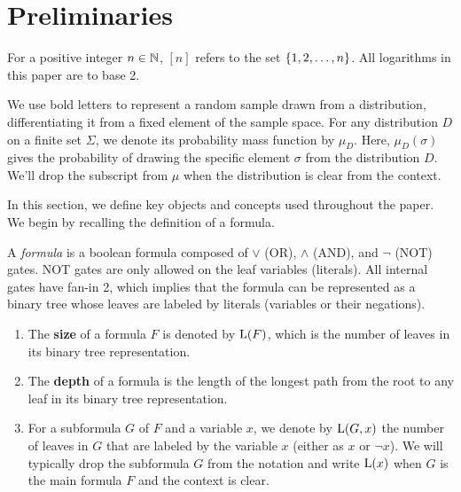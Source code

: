 \section{Preliminaries}
\label{sec:preliminaries}

For a positive integer $n \in \mathbb{N}$, $[n]$ refers to the set $\left\{ 1, 2, \dots, n \right\}$. All logarithms in this paper are to
base 2.

We use bold letters to represent a random sample drawn from a distribution, differentiating it from a fixed element of the sample space. For any distribution $D$ on a finite set $\Sigma$, we denote its probability mass function by $\mu_D$. Here, $\mu_D(\sigma)$ gives the probability of drawing the specific element $\sigma$ from the distribution $D$. We'll drop the subscript from $\mu$ when the distribution is clear from the context. 

In this section, we define key objects and concepts used throughout the paper. We begin by recalling the definition of a \demorgan formula.

\begin{definition}  %
\label{def:demorgan_fomula}
A \emph{\demorgan formula} is a boolean formula composed of $\lor$ (OR), $\land$ (AND), and $\neg$ (NOT) gates. NOT gates are only allowed on the leaf variables (literals). All internal gates have fan-in 2, which implies that the formula can be represented as a binary tree whose leaves are labeled by literals (variables or their negations).
\begin{enumerate}
    \item The \textbf{size} of a \demorgan formula $F$ is denoted by $\mathrm{L}(F)$, which is the number of leaves in its binary tree representation. 
    \item The \textbf{depth} of a \demorgan formula is the length of the longest path from the root to any leaf in its binary tree representation.
    \item For a subformula $G$ of $F$ and a variable $x$, we denote by $\mathrm{L}(G, x)$ the number of leaves in $G$ that are labeled by the variable $x$ (either as $x$ or $\neg x$). We will typically drop the subformula $G$ from the notation and write $\mathrm{L}(x)$ when $G$ is the main formula $F$ and the context is clear.
\end{enumerate}
\end{definition}

